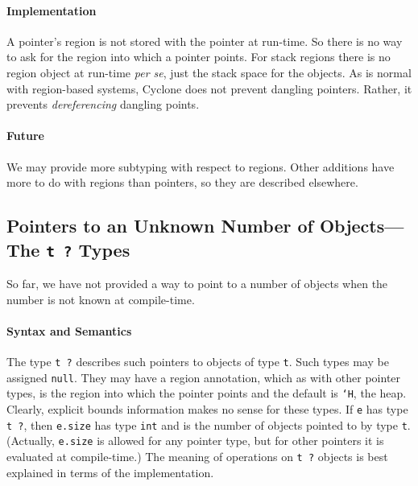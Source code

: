 \paragraph{Implementation} A pointer's region is not stored with the
pointer at run-time.  So there is no way to ask for the region into
which a pointer points.  For stack regions there is no region object
at run-time \emph{per se}, just the stack space for the objects.  As
is normal with region-based systems, Cyclone does not prevent dangling
pointers.  Rather, it prevents \emph{dereferencing} dangling points.


\paragraph{Future} We may provide more subtyping with respect to
regions.  Other additions have more to do with regions than pointers,
so they are described elsewhere.

\subsection*{\hypertarget{pointer_unknown}{Pointers to an Unknown
    Number of Objects---The \texttt{t ?} Types}}

So far, we have not provided a way to point to a number of objects
when the number is not known at compile-time.


\paragraph{Syntax and Semantics} The type \texttt{t ?} describes such pointers
to objects of type \texttt{t}.  Such types may be assigned \texttt{null}.
They may have a region annotation, which as with other pointer types,
is the region into which the pointer points and the default is
\texttt{`H}, the heap.  Clearly, explicit bounds information makes no
sense for these types.  If \texttt{e} has type \texttt{t ?}, then
\texttt{e.size} has type \texttt{int} and is the number of objects pointed
to by type \texttt{t}.  (Actually, \texttt{e.size} is allowed for any
pointer type, but for other pointers it is evaluated at compile-time.)
The meaning of operations on \texttt{t ?} objects is best explained in
terms of the implementation.

